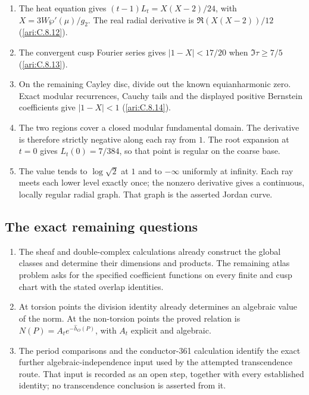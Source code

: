 \RungOne
\begin{enumerate}[label=\arabic*.]
\item The heat equation gives
$(t-1)L_t=X(X-2)/24$, with
$X=3W\wp'(\mu)/g_2$. The real radial derivative is
$\Re(X(X-2))/12$ (\ref{ari:C.8.12}).
\item The convergent cusp Fourier series gives
$|1-X|<17/20$ when $\Im\tau\ge7/5$
(\ref{ari:C.8.13}).
\item On the remaining Cayley disc, divide out the
known equianharmonic zero. Exact modular recurrences,
Cauchy tails and the displayed positive Bernstein
coefficients give $|1-X|<1$
(\ref{ari:C.8.14}).
\item The two regions cover a closed modular
fundamental domain. The derivative is therefore
strictly negative along each ray from $1$.
The root expansion at $t=0$ gives
$L_t(0)=7/384$, so that point is regular on the
coarse base.
\item The value tends to $\log\sqrt2$ at $1$ and
to $-\infty$ uniformly at infinity. Each ray meets
each lower level exactly once; the nonzero derivative
gives a continuous, locally regular radial graph.
That graph is the asserted Jordan curve.
\end{enumerate}

\subsection{The exact remaining questions}
\RungOne
\begin{enumerate}[label=\arabic*.]
\item The sheaf and double-complex calculations
already construct the global classes and determine
their dimensions and products. The remaining atlas
problem asks for the specified coefficient functions
on every finite and cusp chart with the stated
overlap identities.
\item At torsion points the division identity
already determines an algebraic value of the norm.
At the non-torsion points the proved relation is
$N(P)=A_t e^{-\widehat h_O(P)}$, with $A_t$
explicit and algebraic.
\item The period comparisons and the conductor-361
calculation identify the exact further
algebraic-independence input used by the attempted
transcendence route. That input is recorded as an
open step, together with every established identity;
no transcendence conclusion is asserted from it.
\end{enumerate}

